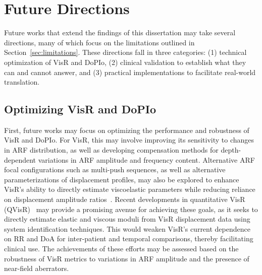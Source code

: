
\section{Future Directions}

Future works that extend the findings of this dissertation may take several directions, many of which focus on the limitations outlined in Section~\ref{sec:limitations}. These directions fall in three categories: (1) technical optimization of VisR and DoPIo, (2) clinical validation to establish what they can and cannot answer, and (3) practical implementations to facilitate real-world translation.

\subsection{Optimizing VisR and DoPIo}

%
%

First, future works may focus on optimizing the performance and robustness of VisR and DoPIo. For VisR, this may involve improving its sensitivity to changes in ARF distribution, as well as developing compensation methods for depth-dependent variations in ARF amplitude and frequency content. Alternative ARF focal configurations such as multi-push sequences, as well as alternative parameterizations of displacement profiles, may also be explored to enhance VisR's ability to directly estimate viscoelastic parameters while reducing reliance on displacement amplitude ratios~\cite{richardson_StateSpace_2023}. Recent developments in quantitative VisR (QVisR)~\cite{richardson_Quantitative_2024} may provide a promising avenue for achieving these goals, as it seeks to directly estimate elastic and viscous moduli from VisR displacement data using system identification techniques. This would weaken VisR's current dependence on RR and DoA for inter-patient and temporal comparisons, thereby facilitating clinical use. The achievements of these efforts may be assessed based on the robustness of VisR metrics to variations in ARF amplitude and the presence of near-field aberrators.

